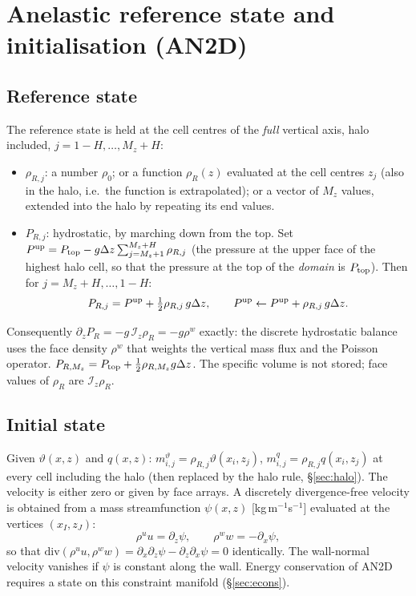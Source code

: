 \documentclass[11pt,a4paper]{article}
\newcommand{\vt}{\vartheta}                    %
\newcommand{\Iz}{\mathcal{I}_z}
\begin{document}
\section{Anelastic reference state and initialisation (AN2D)}\label{sec:ref}
\subsection{Reference state}
The reference state is held at the cell centres of the \emph{full} vertical axis, halo included, $j=1-H,\dots,M_z+H$:
\begin{itemize}
  \item $\rho_{R,j}$: a number $\rho_0$; or a function $\rho_R(z)$ evaluated at the cell centres $z_j$ (also in the halo, i.e.\ the function is extrapolated); or a vector of $M_z$ values, extended into the halo by repeating its end values.
  \item $P_{R,j}$: hydrostatic, by marching down from the top. Set $P^{\rm up}=P_{\rm top}-g\Delta z\sum_{j=M_z+1}^{M_z+H}\rho_{R,j}$ (the pressure at the upper face of the highest halo cell, so that the pressure at the top of the \emph{domain} is $P_{\rm top}$). Then for $j=M_z+H,\dots,1-H$:
        \begin{equation}
          P_{R,j}=P^{\rm up}+\tfrac12\rho_{R,j}\,g\Delta z,\qquad P^{\rm up}\leftarrow P^{\rm up}+\rho_{R,j}\,g\Delta z .
          \label{eq:hydro}
        \end{equation}
\end{itemize}
Consequently $\partial_zP_R=-g\,\Iz\rho_R=-g\rho^w$ exactly: the discrete hydrostatic balance uses the face density $\rho^w$ that weights the vertical mass flux and the Poisson operator. $P_{R,M_z}=P_{\rm top}+\tfrac12\rho_{R,M_z}g\Delta z$.
The specific volume is not stored; face values of $\rho_R$ are $\Iz\rho_R$.

\subsection{Initial state}
Given $\vt(x,z)$ and $q(x,z)$: $m^\vt_{i,j}=\rho_{R,j}\vt(x_i,z_j)$, $m^q_{i,j}=\rho_{R,j}q(x_i,z_j)$ at every cell including the halo (then replaced by the halo rule, \S\ref{sec:halo}). The velocity is either zero or given by face arrays. A discretely divergence-free velocity is obtained from a mass streamfunction $\psi(x,z)$ [kg\,m$^{-1}$s$^{-1}$] evaluated at the vertices $(x_I,z_J)$:
\begin{equation}
  \rho^uu=\partial_z\psi,\qquad \rho^ww=-\partial_x\psi,
\end{equation}
so that $\mathrm{div}(\rho^uu,\rho^ww)=\partial_x\partial_z\psi-\partial_z\partial_x\psi=0$ identically. The wall-normal velocity vanishes if $\psi$ is constant along the wall.
Energy conservation of AN2D requires a state on this constraint manifold (\S\ref{sec:econs}).
\end{document}
